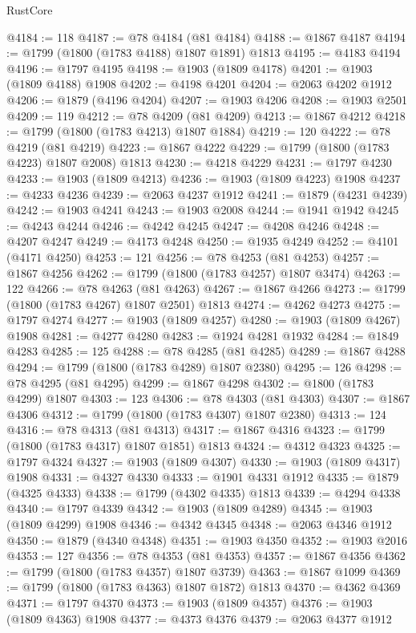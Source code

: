\begin{lexlean}{RustCore}
\begin{coremodule}
@4184 := 118
@4187 := @78 @4184 (@81 @4184)
@4188 := @1867 @4187
@4194 := @1799 (@1800 (@1783 @4188) @1807 @1891) @1813
@4195 := @4183 @4194
@4196 := @1797 @4195
@4198 := @1903 (@1809 @4178)
@4201 := @1903 (@1809 @4188) @1908
@4202 := @4198 @4201
@4204 := @2063 @4202 @1912
@4206 := @1879 (@4196 @4204)
@4207 := @1903 @4206
@4208 := @1903 @2501
@4209 := 119
@4212 := @78 @4209 (@81 @4209)
@4213 := @1867 @4212
@4218 := @1799 (@1800 (@1783 @4213) @1807 @1884)
@4219 := 120
@4222 := @78 @4219 (@81 @4219)
@4223 := @1867 @4222
@4229 := @1799 (@1800 (@1783 @4223) @1807 @2008) @1813
@4230 := @4218 @4229
@4231 := @1797 @4230
@4233 := @1903 (@1809 @4213)
@4236 := @1903 (@1809 @4223) @1908
@4237 := @4233 @4236
@4239 := @2063 @4237 @1912
@4241 := @1879 (@4231 @4239)
@4242 := @1903 @4241
@4243 := @1903 @2008
@4244 := @1941 @1942
@4245 := @4243 @4244
@4246 := @4242 @4245
@4247 := @4208 @4246
@4248 := @4207 @4247
@4249 := @4173 @4248
@4250 := @1935 @4249
@4252 := @4101 (@4171 @4250)
@4253 := 121
@4256 := @78 @4253 (@81 @4253)
@4257 := @1867 @4256
@4262 := @1799 (@1800 (@1783 @4257) @1807 @3474)
@4263 := 122
@4266 := @78 @4263 (@81 @4263)
@4267 := @1867 @4266
@4273 := @1799 (@1800 (@1783 @4267) @1807 @2501) @1813
@4274 := @4262 @4273
@4275 := @1797 @4274
@4277 := @1903 (@1809 @4257)
@4280 := @1903 (@1809 @4267) @1908
@4281 := @4277 @4280
@4283 := @1924 @4281 @1932
@4284 := @1849 @4283
@4285 := 125
@4288 := @78 @4285 (@81 @4285)
@4289 := @1867 @4288
@4294 := @1799 (@1800 (@1783 @4289) @1807 @2380)
@4295 := 126
@4298 := @78 @4295 (@81 @4295)
@4299 := @1867 @4298
@4302 := @1800 (@1783 @4299) @1807
@4303 := 123
@4306 := @78 @4303 (@81 @4303)
@4307 := @1867 @4306
@4312 := @1799 (@1800 (@1783 @4307) @1807 @2380)
@4313 := 124
@4316 := @78 @4313 (@81 @4313)
@4317 := @1867 @4316
@4323 := @1799 (@1800 (@1783 @4317) @1807 @1851) @1813
@4324 := @4312 @4323
@4325 := @1797 @4324
@4327 := @1903 (@1809 @4307)
@4330 := @1903 (@1809 @4317) @1908
@4331 := @4327 @4330
@4333 := @1901 @4331 @1912
@4335 := @1879 (@4325 @4333)
@4338 := @1799 (@4302 @4335) @1813
@4339 := @4294 @4338
@4340 := @1797 @4339
@4342 := @1903 (@1809 @4289)
@4345 := @1903 (@1809 @4299) @1908
@4346 := @4342 @4345
@4348 := @2063 @4346 @1912
@4350 := @1879 (@4340 @4348)
@4351 := @1903 @4350
@4352 := @1903 @2016
@4353 := 127
@4356 := @78 @4353 (@81 @4353)
@4357 := @1867 @4356
@4362 := @1799 (@1800 (@1783 @4357) @1807 @3739)
@4363 := @1867 @1099
@4369 := @1799 (@1800 (@1783 @4363) @1807 @1872) @1813
@4370 := @4362 @4369
@4371 := @1797 @4370
@4373 := @1903 (@1809 @4357)
@4376 := @1903 (@1809 @4363) @1908
@4377 := @4373 @4376
@4379 := @2063 @4377 @1912

\end{coremodule}
\end{lexlean}
